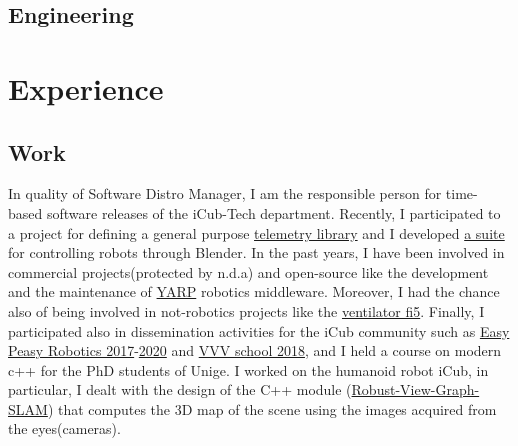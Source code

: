\documentclass[10pt,a4paper]{moderncv}
\begin{document}
\subsection{Engineering}
\newpage
\section{Experience}
\subsection{Work}
{
In quality of Software Distro Manager, I am the responsible person for time-based software releases of the iCub-Tech department.
Recently, I participated to a project for defining a general purpose \href{https://github.com/robotology/yarp-telemetry}{telemetry library} and I developed \href{https://github.com/robotology/blender-robotics-utils}{a suite} for controlling robots through Blender.
In the past years, I have been involved in commercial projects(protected by n.d.a) and open-source like the development and the maintenance of \href{https://github.com/robotology/yarp}{YARP} robotics middleware.
Moreover, I had the chance also of being involved in not-robotics projects like the \href{https://github.com/icub-tech-iit/ventilator-fi5}{ventilator fi5}.
Finally, I participated also in dissemination activities for the iCub community such as \href{https://easy-peasy-robotics.github.io/editions/mfr17/course-program.html}{Easy Peasy Robotics 2017}-\href{https://easy-peasy-robotics.github.io/editions/web20/course-program.html}{2020}
and \href{http://www.icub.org/school/2018}{VVV school 2018}, and I held a course on modern c++ for the PhD students of Unige.}
{I worked on the humanoid robot iCub, in particular, I dealt with the design of the C++ module (\href{https://github.com/robotology-playground/Robust-View-Graph-SLAM}{Robust-View-Graph-SLAM}) that computes the 3D map of the scene using the images acquired from the eyes(cameras).}
\end{document}
